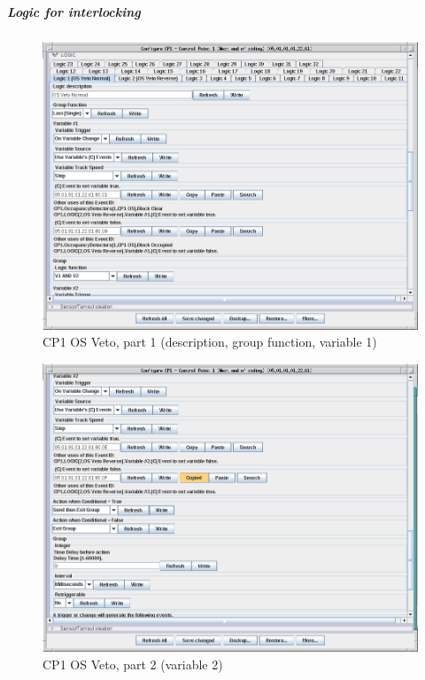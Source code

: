 \subparagraph{Logic for interlocking}
\begin{figure}[hbpt]\begin{centering}%
\includegraphics[width=5in]{CP1-OSVeto-Normal1.png}
\caption{CP1 OS Veto, part 1 (description, group function, variable 1)}
\label{fig:CP1-OSVeto-Normal1}
\end{centering}\end{figure}                                                    
\begin{figure}[hbpt]\begin{centering}%
\includegraphics[width=5in]{CP1-OSVeto-Normal2.png}
\caption{CP1 OS Veto, part 2 (variable 2)}
\label{fig:CP1-OSVeto-Normal2}
\end{centering}\end{figure}                                                    
